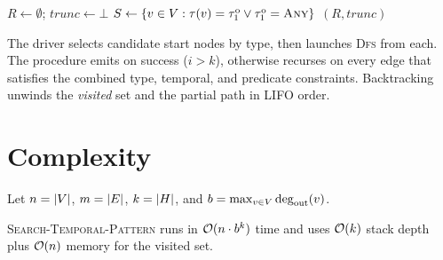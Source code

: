\documentclass[11pt,openany]{book}
\begin{document}
\begin{algorithm}[H]
\caption{\textsc{Search-Temporal-Pattern}$(G, H, [t_{\text{lo}}, t_{\text{hi}}], c)$}
\label{alg:dfs}

$R \gets \emptyset$; $\mathit{trunc} \gets \bot$\;
$S \gets \{v \in V : \tau(v) = \tau^{\mathrm{o}}_1 \lor \tau^{\mathrm{o}}_1 = \textsc{Any}\}$\;
\KwReturn $(R, \mathit{trunc})$\;

\BlankLine
{}
\end{algorithm}

The driver selects candidate start nodes by type, then launches
\textsc{Dfs} from each. The procedure emits on success ($i > k$),
otherwise recurses on every edge that satisfies the combined type,
temporal, and predicate constraints. Backtracking unwinds the
\emph{visited} set and the partial path in LIFO order.

\section{Complexity}
\label{sec:dfs:complexity}

Let $n = \lvert V \rvert$, $m = \lvert E \rvert$, $k = \lvert H \rvert$, and
$b = \max_{v \in V} \operatorname{deg}_{\text{out}}(v)$.

\begin{theorem}
\label{thm:dfs:worst}
\textsc{Search-Temporal-Pattern} runs in $\mathcal{O}(n \cdot b^k)$ time
and uses $\mathcal{O}(k)$ stack depth plus $\mathcal{O}(n)$ memory for the
visited set.
\end{theorem}
\end{document}

